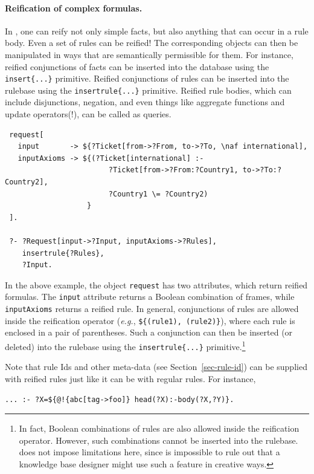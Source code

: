 \documentclass[11pt]{article}
\newcommand{\ERGO}{\mbox{\smaller{\ensuremath{\cal{E}}\smaller{{\sc{RGO}}}}}\xspace}
\newcommand{\FLSYSTEM}{\ERGO}
\begin{document}
\paragraph{Reification of complex formulas.}
In \FLSYSTEM, one can reify not only simple facts, but also anything that
can occur in a rule body. Even a set of rules can be reified!
The corresponding objects can then be manipulated in ways that are semantically
permissible for them. For instance, reified conjunctions of facts can be
inserted into the database using the \verb|insert{...}| primitive. 
Reified conjunctions of rules can be inserted into the rulebase using the
\verb|insertrule{...}| primitive. Reified rule bodies, which can include
disjunctions, negation, and even things like aggregate functions and update
operators(!), can be called as queries.
\begin{verbatim}
 request[
   input       -> ${?Ticket[from->?From, to->?To, \naf international],
   inputAxioms -> ${(?Ticket[international] :-
                        ?Ticket[from->?From:?Country1, to->?To:?Country2],
                        ?Country1 \= ?Country2)
                   }
 ].

 ?- ?Request[input->?Input, inputAxioms->?Rules],
    insertrule{?Rules},
    ?Input.
\end{verbatim}

In the above example, the object {\tt request} has two attributes, which
return reified formulas. The {\tt input} attribute returns a Boolean
combination of frames, while {\tt inputAxioms} returns a reified rule.
In general, conjunctions of rules are allowed inside the reification
operator ({\it e.g.}, \verb|${(rule1), (rule2)}|), where each rule is
enclosed in a pair of parentheses. Such a conjunction can then be inserted
(or deleted) into the rulebase using the {\tt insertrule\{...\}}
primitive.\footnote{
  In fact, Boolean combinations of rules are also allowed inside the
  reification operator. However, such combinations cannot be inserted into
  the rulebase. \FLSYSTEM does not impose limitations here, since is
  impossible to rule out that a knowledge base designer might use such a
  feature in creative ways.
}

Note that rule Ids and other meta-data (see
Section~\ref{sec-rule-id}) can be supplied with reified rules just like it
can be with regular rules. For instance,
\begin{verbatim}
... :- ?X=${@!{abc[tag->foo]} head(?X):-body(?X,?Y)}.
\end{verbatim}
\end{document}
